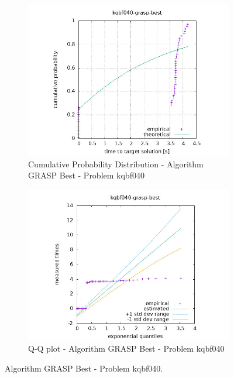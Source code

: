 \begin{figure}[H]
    \centering
    \begin{subfigure}{0.49\textwidth}
        \includegraphics[width=\textwidth]{figure/ttt_plot/kqbf040-grasp-best-exp.jpeg}
        \caption{Cumulative Probability Distribution - Algorithm GRASP Best - Problem kqbf040}
        \label{fig:grasp-best-kqbf040-exp}
    \end{subfigure}
    \hfill
    \begin{subfigure}{0.49\textwidth}
        \includegraphics[width=\textwidth]{figure/ttt_plot/kqbf040-grasp-best-qq.jpeg}
        \caption{Q-Q plot - Algorithm GRASP Best - Problem kqbf040}
        \label{fig:grasp-best-kqbf040-qq}
    \end{subfigure}
    \caption{Algorithm GRASP Best - Problem kqbf040.}
    \label{fig:grasp-best-kqbf040}
\end{figure}


